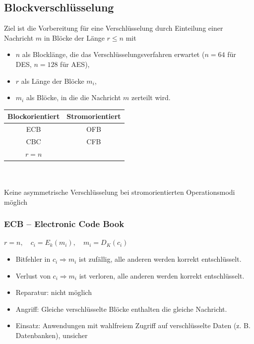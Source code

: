 \documentclass[8pt,a4paper,landscape]{article}
\begin{document}
\begin{multicols}{4}
\subsection{Blockverschlüsselung}
Ziel ist die Vorbereitung für eine Verschlüsselung durch Einteilung einer Nachricht $m$ in Blöcke der Länge $r \leq n$ mit 
\begin{itemize}[itemsep=1pt] 
 \item $n$ als Blocklänge, die das Verschlüsselungsverfahren erwartet ($n = 64$ für DES, $n = 128$ für AES), 
 \item $r$ als Länge der Blöcke $m_i$,
 \item $m_i$ als Blöcke, in die die Nachricht $m$ zerteilt wird.
 \end{itemize}
 \begin{center}
\begin{tabular}{ c | c }
  \textbf{Blockorientiert} & \textbf{Stromorientiert} \\
  \hline
  ECB & OFB \\
  CBC & CFB \\
  $r = n$ & \\
\end{tabular}
\small \\~\\Keine asymmetrische Verschlüsselung bei stromorientierten Operationsmodi möglich
\end{center}

\subsubsection{ECB – Electronic Code Book} 
\(r=n, \quad c_i = E_k(m_i), \quad m_i = D_K(c_i)\)\begin{itemize}[itemsep=1pt]
\item Bitfehler in \(c_i \Rightarrow m_i \) ist zufällig, alle anderen werden korrekt entschlüsselt. 
\item Verlust von \(c_i \Rightarrow m_i \) ist verloren, alle anderen werden korrekt entschlüsselt. 
\item Reparatur: nicht möglich
\item Angriff: Gleiche verschlüsselte Blöcke enthalten die gleiche Nachricht. 
\item Einsatz: Anwendungen mit wahlfreiem Zugriff auf verschlüsselte Daten (z. B. Datenbanken), unsicher
\end{itemize}


\end{multicols}
\end{document}

